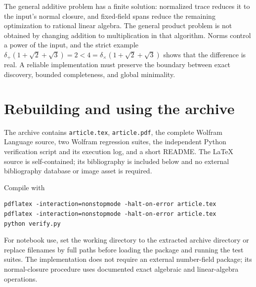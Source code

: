 \documentclass[11pt,letterpaper]{article}
\theoremstyle{definition}
\newcommand{\dplus}{\delta_{+}}
\newcommand{\dtimes}{\delta_{\times}}
\newcommand{\code}[1]{\texttt{#1}}
\begin{document}
The general additive problem has a finite solution: normalized trace reduces it to the input's normal closure, and fixed-field spans reduce the remaining optimization to rational linear algebra. The general product problem is not obtained by changing addition to multiplication in that algorithm. Norms control a power of the input, and the strict example $\dplus(1+\sqrt2+\sqrt3)=2<4=\dtimes(1+\sqrt2+\sqrt3)$ shows that the difference is real. A reliable implementation must preserve the boundary between exact discovery, bounded completeness, and global minimality.

\appendix
\section{Rebuilding and using the archive}
The archive contains \code{article.tex}, \code{article.pdf}, the complete Wolfram Language source, two Wolfram regression suites, the independent Python verification script and its execution log, and a short README. The LaTeX source is self-contained; its bibliography is included below and no external bibliography database or image asset is required.

Compile with
\begin{samepage}
\begin{lstlisting}[language={},basicstyle=\ttfamily\small]
pdflatex -interaction=nonstopmode -halt-on-error article.tex
pdflatex -interaction=nonstopmode -halt-on-error article.tex
python verify.py
\end{lstlisting}
\end{samepage}
For notebook use, set the working directory to the extracted archive directory or replace filenames by full paths before loading the package and running the test suites. The implementation does not require an external number-field package; its normal-closure procedure uses documented exact algebraic and linear-algebra operations.
\end{document}
